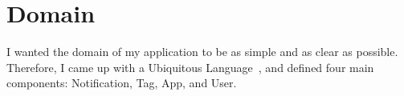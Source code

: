 \section{Domain}\label{sec:domain}

I wanted the domain of my application
to be as simple and as clear as possible.
Therefore,
I came up with
a Ubiquitous Language~\cite{evans_domain-driven_2003,millett_patterns_2015},
and defined four main components: Notification, Tag, App, and User.





